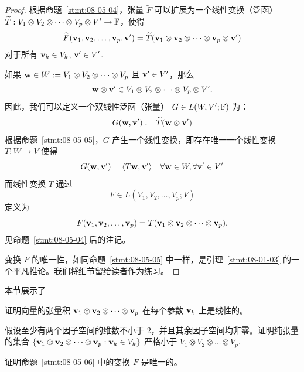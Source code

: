 \begin{proof}
根据命题~\ref{stmt:08-05-04}，张量 $\widetilde{F}$ 可以扩展为一个线性变换（泛函） $\widetilde{T} : V_1 \otimes V_2 \otimes \dots \otimes V_p \otimes V' \to \mathbb{F}$，使得
$$ \widetilde{F}(\mathbf{v}_1, \mathbf{v}_2, \dots, \mathbf{v}_p, \mathbf{v}') = \widetilde{T}(\mathbf{v}_1 \otimes \mathbf{v}_2 \otimes \dots \otimes \mathbf{v}_p \otimes \mathbf{v}') $$
对于所有 $\mathbf{v}_k \in V_k$, $\mathbf{v}' \in V'$.~

如果 $\mathbf{w} \in W := V_1 \otimes V_2 \otimes \dots \otimes V_p$ 且 $\mathbf{v}' \in V'$，那么
$$\mathbf{w} \otimes \mathbf{v}' \in V_1 \otimes V_2 \otimes \dots \otimes V_p \otimes V'.$$
因此，我们可以定义一个双线性泛函（张量） $G \in L(W, V'; \mathbb{F})$ 为：
$$ G(\mathbf{w}, \mathbf{v}') := \widetilde{T}(\mathbf{w} \otimes \mathbf{v}') $$
根据命题~\ref{stmt:08-05-05}，$G$ 产生一个线性变换，即存在唯一一个线性变换 $T : W \to V$ 使得
$$ G(\mathbf{w}, \mathbf{v}') = \langle T\mathbf{w}, \mathbf{v}' \rangle \quad \forall \mathbf{w} \in W, \forall \mathbf{v}' \in V' $$
而线性变换 $T$ 通过
$$F \in L(V_1, V_2, \dots, V_p; V)$$
定义为
$$ F(\mathbf{v}_1, \mathbf{v}_2, \dots, \mathbf{v}_p) = T(\mathbf{v}_1 \otimes \mathbf{v}_2 \otimes \dots \otimes \mathbf{v}_p), $$
见命题~\ref{stmt:08-05-04} 后的注记。

变换 $F$ 的唯一性，如同命题~\ref{stmt:08-05-05} 中一样，是引理~\ref{stmt:08-01-03} 的一个平凡推论。我们将细节留给读者作为练习。\end{proof}

本节展示了



\begin{problemset}
\item \label{ex:08-05-01} 证明向量的张量积 $\mathbf{v}_1 \otimes \mathbf{v}_2 \otimes \dots \otimes \mathbf{v}_p$ 在每个参数 $\mathbf{v}_k$ 上是线性的。
\item \label{ex:08-05-02} 假设至少有两个因子空间的维数不小于 $2$，并且其余因子空间均非零。证明纯张量的集合 $\{\mathbf{v}_1 \otimes \mathbf{v}_2 \otimes \dots \otimes \mathbf{v}_p : \mathbf{v}_k \in V_k\}$ 严格小于 $V_1 \otimes V_2 \otimes \dots \otimes V_p$.~
\item \label{ex:08-05-03} 证明命题~\ref{stmt:08-05-06} 中的变换 $F$ 是唯一的。
\end{problemset}

